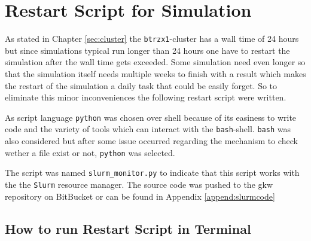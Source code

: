 \section{Restart Script for Simulation}
\label{sec:restartscript}

As stated in Chapter \ref{sec:cluster} the \texttt{btrzx1}-cluster has a wall time of 24 hours but since simulations typical run longer than 24 hours one have to restart the simulation after the wall time gets exceeded. Some simulation need even longer so that the simulation itself needs multiple weeks to finish with a result which makes the restart of the simulation a daily task that could be easily forget. So to eliminate this minor inconveniences the following restart script were written.

As script language \texttt{python} was chosen over shell because of its easiness to write code and the variety of tools which can interact with the \texttt{bash}-shell. \texttt{bash} was also considered but after some issue occurred regarding the mechanism to check wether a file exist or not, \texttt{python} was selected.

The script was named \texttt{slurm\_monitor.py} to indicate that this script works with the the \texttt{Slurm} resource manager. The source code was pushed to the gkw repository on BitBucket \cite{slurmmonitor} or can be found in Appendix \ref{append:slurmcode}

\subsection{How to run Restart Script in Terminal}
\label{sub:codeRun}

